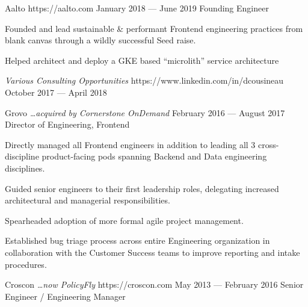 \documentclass{resume}
\begin{document}
\employer
    {Aalto}
    {https://aalto.com}
    {January 2018 --- June 2019}
    {Founding Engineer}
    {\begin{jobitems}
        \item Founded and lead sustainable \& performant Frontend engineering practices from blank canvas through a wildly successful Seed raise.
        \item Helped architect and deploy a GKE based ``microlith'' service architecture
    \end{jobitems}}
\employer
    {\emph{Various Consulting Opportunities}}
    {https://www.linkedin.com/in/dcousineau}
    {October 2017 --- April 2018}
    {}
    {}

\employer
    {Grovo \emph{\ldots acquired by Cornerstone OnDemand}}
    {}
    {February 2016 --- August 2017}
    {Director of Engineering, Frontend}
    {\begin{jobitems}
        \item Directly managed all Frontend engineers in addition to leading all 3 cross-discipline product-facing pods spanning Backend and Data engineering disciplines.
        \item Guided senior engineers to their first leadership roles, delegating increased architectural and managerial responsibilities.
        \item Spearheaded adoption of more formal agile project management.
        \item Established bug triage process across entire Engineering organization in collaboration with the Customer Success teams to improve reporting and intake procedures.
    \end{jobitems}}
\employer
    {Croscon \emph{\ldots now PolicyFly}}
    {https://croscon.com}
    {May 2013 --- February 2016}
    {Senior Engineer / Engineering Manager}
\end{document}
